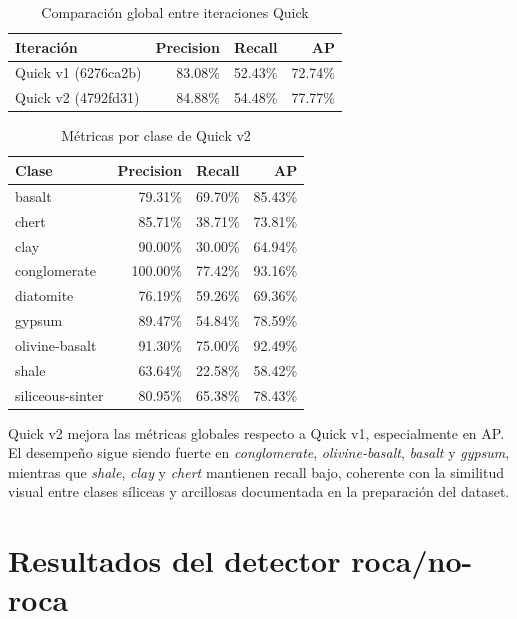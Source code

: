 \begin{table}[H]
  \centering
  \caption{Comparación global entre iteraciones Quick}
  \label{tab:metricas-globales}
  \begin{tabular}{@{}lrrr@{}}
    \toprule
    Iteración & Precision & Recall & AP \\
    \midrule
    Quick v1 (6276ca2b) & 83.08\% & 52.43\% & 72.74\% \\
    Quick v2 (4792fd31) & 84.88\% & 54.48\% & 77.77\% \\
    \bottomrule
  \end{tabular}
\end{table}

\begin{table}[H]
  \centering
  \caption{Métricas por clase de Quick v2}
  \label{tab:metricas-clase}
  \begin{tabular}{@{}lrrr@{}}
    \toprule
    Clase & Precision & Recall & AP \\
    \midrule
    basalt & 79.31\% & 69.70\% & 85.43\% \\
    chert & 85.71\% & 38.71\% & 73.81\% \\
    clay & 90.00\% & 30.00\% & 64.94\% \\
    conglomerate & 100.00\% & 77.42\% & 93.16\% \\
    diatomite & 76.19\% & 59.26\% & 69.36\% \\
    gypsum & 89.47\% & 54.84\% & 78.59\% \\
    olivine-basalt & 91.30\% & 75.00\% & 92.49\% \\
    shale & 63.64\% & 22.58\% & 58.42\% \\
    siliceous-sinter & 80.95\% & 65.38\% & 78.43\% \\
    \bottomrule
  \end{tabular}
\end{table}

Quick v2 mejora las métricas globales respecto a Quick v1, especialmente en AP.
El desempeño sigue siendo fuerte en \emph{conglomerate}, \emph{olivine-basalt},
\emph{basalt} y \emph{gypsum}, mientras que \emph{shale}, \emph{clay} y
\emph{chert} mantienen recall bajo, coherente con la similitud visual entre clases
síliceas y arcillosas documentada en la preparación del dataset.

\section{Resultados del detector roca/no-roca}

